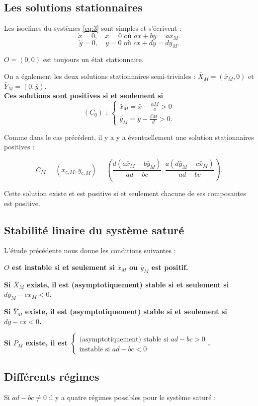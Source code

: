 \documentclass[a4paper,11pt,draft]{article}
\begin{document}
\subsection{Les solutions stationnaires}
Les isoclines du systèmes \eqref{eq:3} sont simples et s'écrivent :
$$\dot{x}=0, \quad x=0\text{ où } ax+by=a\bar{x}_M.$$
$$\dot{y}=0, \quad y=0\text{ où } cx+dy=d\bar{y}_M.$$

$O=(0,0)$ est toujours un état stationnaire.


 On a également  les deux solutions stationnaires semi-triviales :
$\bar{X}_M=(\bar{x}_M,0)$ et $\bar{Y}_M=(0,\bar{y})$.\\
{\bf Ces solutions sont positives si et seulement si 
$$(C_0)\;:\;\begin{cases} \bar{x}_M=\bar{x}-\frac{\alpha M}{a}>0 \\ \bar{y}_M=\bar{y}-\frac{\beta M}{d}>0.\end{cases}$$}

Comme dans le cas précédent, il y a  y a éventuellement une solution stationnaires positives :

$$\bar{C}_M=(x_{c,M},y_{c,M})=\left(\frac{d(a\bar{x}_M-b\bar{y}_M)}{ad-bc},\frac{a(d\bar{y}_M-c\bar{x}_M)}{ad-bc}\right).$$

Cette solution existe et est positive si et seulement chacune de ses composantes est positive.  
\subsection{Stabilité linaire du système saturé}

L'étude précédente nous donne les conditions suivantes :

{\bf $O$ est  instable si et seulement si $\bar{x}_M$ ou $\bar{y}_M$ est positif.}

{\bf Si $\bar{X}_M$ existe, il est  (asymptotiquement) stable si et seulement si $d\bar{y}_M-c\bar{x}_M <0$.}

{\bf Si $\bar{Y}_M$ existe, il est (asymptotiquement) stable si et seulement si $d\bar{y}-c\bar{x} <0$.}

{\bf Si $P_M$ existe, il est $\begin{cases} \text{(asymptotiquement) stable si $ad-bc>0$}\\
\text{instable si $ad-bc<0$ }\end{cases}$.}

\subsection{Différents régimes}
Si $ad-bc\neq 0$ il y a quatre régimes possibles pour le système saturé :
\end{document}
